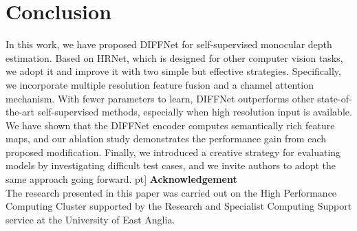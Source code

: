 \documentclass{bmvc2k}
\begin{document}
\section{Conclusion}
In this work, we have proposed DIFFNet for self-supervised monocular depth estimation. Based on HRNet, which is designed for other computer vision tasks, we adopt it and improve it with two simple but effective strategies. Specifically, we incorporate multiple resolution feature fusion and a channel attention mechanism. With fewer parameters to learn, DIFFNet outperforms other state-of-the-art self-supervised methods, especially when high resolution input is available. 
We have shown that the DIFFNet encoder computes semantically rich feature maps, and our ablation study demonstrates the performance gain from each proposed modification.
Finally, we introduced a creative strategy for evaluating models by investigating difficult test cases, and we invite authors to adopt the same approach going forward. 
\5pt]
\textbf{Acknowledgement}\\
The research presented in this paper was carried out on the High Performance Computing Cluster supported by the Research and Specialist Computing Support service at the University of East Anglia.


\end{document}
